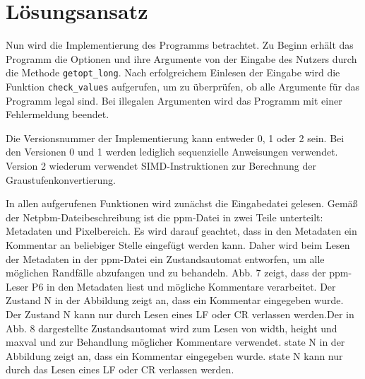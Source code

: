 \documentclass[course=erap]{aspdoc}
\begin{document}
\section{Lösungsansatz}

\par
Nun wird die Implementierung des Programms betrachtet. Zu Beginn erhält das Programm die Optionen und ihre Argumente von der Eingabe des Nutzers durch die Methode \texttt{getopt\_long}\cite{getoptlong3}. Nach erfolgreichem Einlesen der Eingabe wird die Funktion \texttt{check\_values} aufgerufen, um zu überprüfen, ob alle Argumente für das Programm legal sind. Bei illegalen Argumenten wird das Programm mit einer Fehlermeldung beendet.

\par
Die Versionsnummer der Implementierung kann entweder 0, 1 oder 2 sein. Bei den Versionen 0 und 1 werden lediglich sequenzielle Anweisungen verwendet. Version 2 wiederum verwendet SIMD-Instruktionen zur Berechnung der Graustufenkonvertierung.

\par
In allen aufgerufenen Funktionen wird zunächst die Eingabedatei gelesen. Gemäß der Netpbm-Dateibeschreibung ist die ppm-Datei in zwei Teile unterteilt: Metadaten und Pixelbereich. Es wird darauf geachtet, dass in den Metadaten ein Kommentar an beliebiger Stelle eingefügt werden kann. Daher wird beim Lesen der Metadaten in der ppm-Datei ein Zustandsautomat entworfen, um alle möglichen Randfälle abzufangen und zu behandeln. Abb. 7 zeigt, dass der ppm-Leser P6 in den Metadaten liest und mögliche Kommentare verarbeitet. Der Zustand N in der Abbildung zeigt an, dass ein Kommentar eingegeben wurde. Der Zustand N kann nur durch Lesen eines LF oder CR verlassen werden.Der in Abb. 8 dargestellte Zustandsautomat wird zum Lesen von width, height und maxval und zur Behandlung möglicher Kommentare verwendet. state N in der Abbildung zeigt an, dass ein Kommentar eingegeben wurde. state N kann nur durch das Lesen eines LF oder CR verlassen werden.
\end{document}
